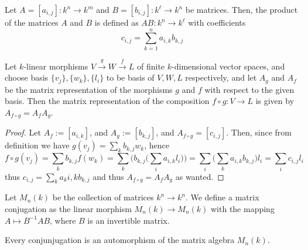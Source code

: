 \begin{definition}\label{def: matrix multiplication}
  Let \(A = [a_{i,j}] : k^n \to k^m\) and \(B = [b_{i, j}] : k^\ell \to k^n\) be
  matrices. Then, the product of the matrices \(A\) and \(B\) is defined as
  \(AB : k^n \to k^\ell\) with coefficients
  \[
    c_{i, j} = \sum_{k=1}^n a_{i, k} b_{k, j}
  \]
\end{definition}

\begin{proposition}
  \label{prop: matrix of the composition}
  Let \(k\)-linear morphisms \(V \xrightarrow g W \xrightarrow f L\) of finite
  \(k\)-dimensional vector spaces, and choose basis \(\{v_j\}, \{w_k\}, \{l_i\}\)
  to be basis of \(V, W, L\) respectively, and let \(A_g\) and \(A_f\) be the
  matrix representation of the morphisms \(g\) and \(f\) with respect to the
  given basis. Then the matrix representation of the composition \(f \circ g: V
  \to L\) is given by \(A_{f \circ g} = A_f A_g\).
\end{proposition}

\begin{proof}
  Let \(A_f := [a_{i, k}]\), and \(A_g := [b_{k, j}]\), and \(A_{f \circ g} =
  [c_{i, j}]\). Then, since from definition we have \(g(v_j) = \sum_k b_{k, j}
  w_k\), hence
  \[
    f \circ g(v_j) =
    \sum_k b_{k, j} f(w_k) =
    \sum_k \bigg( b_{k, j} \bigg( \sum_i a_{i, k} l_i \bigg) \bigg)
    = \sum_i \bigg( \sum_k a_{i, k} b_{k, j} \bigg) l_i
    = \sum_i c_{i, j} l_i
  \]
  thus \(c_{i, j} = \sum_k a_k{i, k} b_{k, j}\) and thus \(A_{f \circ g} = A_f
  A_g\) as wanted.
\end{proof}

\begin{definition}[Conjugation]\label{def: matrix conjugation}
  Let \(M_n(k)\) be the collection of matrices \(k^n \to k^n\). We define a
  matrix conjugation as the linear morphism \(M_n(k) \to M_n(k)\) with the
  mapping \(A \mapsto B^{-1} A B\), where \(B\) is an invertible matrix.
\end{definition}

\begin{proposition}
  Every conjunjugation is an automorphism of the matrix algebra \(M_n(k)\).
\end{proposition}
